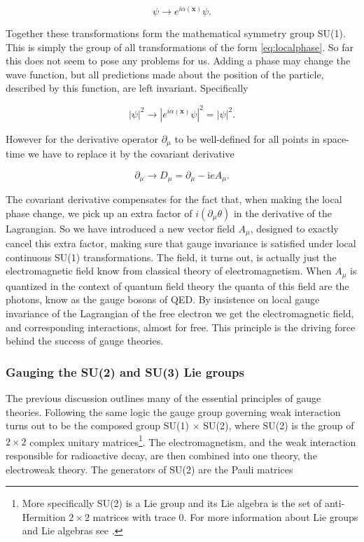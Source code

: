 \begin{equation} \label{eq:localphase}
    \psi \rightarrow e^{i\alpha(\mathbf{x})} \psi.
\end{equation}

Together these transformations form the mathematical symmetry group SU(1). This is simply the group of all transformations of the form \eqref{eq:localphase}.  So far this does not seem to pose any problems for us. Adding a phase may change the wave function, but all predictions made about the position of the particle, described by this function, are left invariant. Specifically

\begin{equation}
	|\psi|^2 \rightarrow |e^{i\alpha(\mathbf{x})} \psi|^2 = |\psi|^2.
\end{equation}

However for the derivative operator $\partial_\mu$ to be well-defined for all points in space-time we have to replace it by the covariant derivative

\begin{equation} \label{eq:covariant}
	\partial_\mu \rightarrow D_\mu = \partial_\mu - \textrm{i}e A_\mu.
\end{equation}

The covariant derivative compensates for the fact that, when making the local phase change, we pick up an extra factor of $i (\partial_\mu \theta)$ in the derivative of the Lagrangian. So we have introduced a new vector field $A_\mu$, designed to exactly cancel this extra factor, making sure that gauge invariance is satisfied under local continuous SU(1) transformations. The field, it turns out, is actually just the electromagnetic field know from classical theory of electromagnetism. When $A_\mu$ is quantized in the context of quantum field theory the quanta of this field are the photons, know as the gauge bosons of QED. By insistence on local gauge invariance of the Lagrangian of the free electron we get the electromagnetic field, and corresponding interactions, almost for free. This principle is the driving force behind the success of gauge theories.

\subsubsection{Gauging the SU(2) and SU(3) Lie groups} \label{sec:su2andsu3}
The previous discussion outlines many of the essential principles of gauge theories. Following the same logic the gauge group governing weak interaction turns out to be the composed group SU(1) $\times$ SU(2), where SU(2) is the group of $2 \times 2$ complex unitary matrices\footnote{More specifically SU(2) is a Lie group and its Lie algebra is the set of anti-Hermition $2 \times 2$ matrices with trace 0. For more information about Lie groups and Lie algebras see  \cite{fulton1991rtf}.}. The electromagnetism, and the weak interaction responsible for radioactive decay, are then combined into one theory, the electroweak theory. The generators of SU(2) are the Pauli matrices

